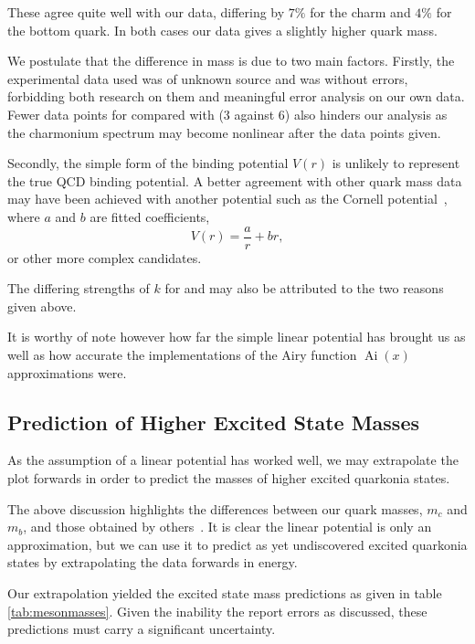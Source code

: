 \documentclass[]{article}
\newcommand{\Ai}[1]{\ensuremath{\operatorname{Ai}({#1})}}
\begin{document}

These agree quite well with our data, differing by $7\%$ for the charm and $4\%$ for the bottom quark. In both cases our data gives a slightly higher quark mass.

We postulate that the difference in mass is due to two main factors. Firstly, the experimental data used was of unknown source and was without errors, forbidding both research on them and meaningful error analysis on our own data. Fewer data points for \ccbar compared with \bbbar (3 against 6) also hinders our analysis as the charmonium spectrum may become nonlinear after the data points given.

Secondly, the simple form of the binding potential $V(r)$ is unlikely to represent the true QCD binding potential. A better agreement with other quark mass data may have been achieved with another potential such as the Cornell potential~\cite{ref:eichten}, where $a$ and $b$ are fitted coefficients,
\[
V(r) = \frac{a}{r} + br,
\]
or other more complex candidates.

The differing strengths of $k$ for \ccbar and \bbbar may also be attributed to the two reasons given above.

It is worthy of note however how far the simple linear potential has brought us as well as how accurate the implementations of the Airy function $\Ai{x}$ approximations were.

\subsection{Prediction of Higher Excited State Masses}\label{ssec:highermasses}

As the assumption of a linear potential has worked well, we may extrapolate the plot forwards in order to predict the masses of higher excited quarkonia states.

The above discussion highlights the differences between our quark masses, $m_{c}$ and $m_{b}$, and those obtained by others~\cite{ref:pdg}. It is clear the linear potential is only an approximation, but we can use it to predict as yet undiscovered excited quarkonia states by extrapolating the data forwards in energy.

Our extrapolation yielded the excited state mass predictions as given in table \ref{tab:mesonmasses}. Given the inability the report errors as discussed, these predictions must carry a significant uncertainty.
\end{document}
